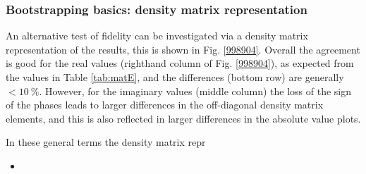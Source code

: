 \subsubsection{Bootstrapping basics: density matrix representation}

An alternative test of fidelity can be investigated via a density matrix representation of the results, this is shown in Fig. \ref{998904}. Overall the agreement is good for the real values (righthand column of Fig. \ref{998904}), as expected from the values in Table \ref{tab:matE}, and the differences (bottom row) are generally $<10~\%$. However, for the imaginary values (middle column) the loss of the sign of the phases leads to larger differences in the off-diagonal density matrix elements, and this is also reflected in larger differences in the absolute value plots.

In these general terms the density matrix repr

\begin{itemize}
\item 
\end{itemize}